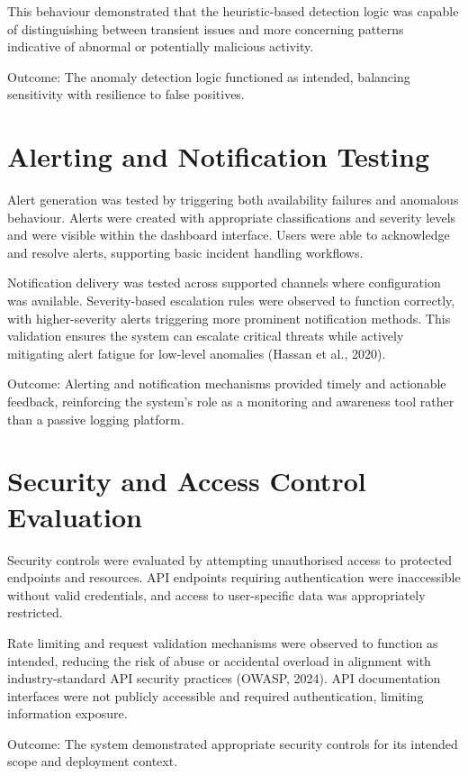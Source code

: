 This behaviour demonstrated that the heuristic-based detection logic was capable of distinguishing between transient issues and more concerning patterns indicative of abnormal or potentially malicious activity.

Outcome: The anomaly detection logic functioned as intended, balancing sensitivity with resilience to false positives.

\section{Alerting and Notification Testing}

Alert generation was tested by triggering both availability failures and anomalous behaviour. Alerts were created with appropriate classifications and severity levels and were visible within the dashboard interface. Users were able to acknowledge and resolve alerts, supporting basic incident handling workflows.

Notification delivery was tested across supported channels where configuration was available. Severity-based escalation rules were observed to function correctly, with higher-severity alerts triggering more prominent notification methods. This validation ensures the system can escalate critical threats while actively mitigating alert fatigue for low-level anomalies (Hassan et al., 2020).

Outcome: Alerting and notification mechanisms provided timely and actionable feedback, reinforcing the system's role as a monitoring and awareness tool rather than a passive logging platform.

\section{Security and Access Control Evaluation}

Security controls were evaluated by attempting unauthorised access to protected endpoints and resources. API endpoints requiring authentication were inaccessible without valid credentials, and access to user-specific data was appropriately restricted.

Rate limiting and request validation mechanisms were observed to function as intended, reducing the risk of abuse or accidental overload in alignment with industry-standard API security practices (OWASP, 2024). API documentation interfaces were not publicly accessible and required authentication, limiting information exposure.

Outcome: The system demonstrated appropriate security controls for its intended scope and deployment context.

